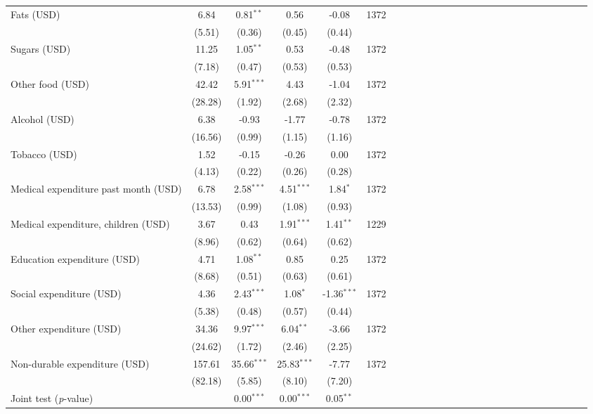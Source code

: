 {\begin{tabular}{l*{5}{SSSSc}}
\hspace{0.2cm}Fats (USD)&     6.84&0.81$^{**}$&     0.56&    -0.08&     1372\\
          &   (5.51)&   (0.36)&   (0.45)&   (0.44)&         \\
\hspace{0.2cm}Sugars (USD)&    11.25&1.05$^{**}$&     0.53&    -0.48&     1372\\
          &   (7.18)&   (0.47)&   (0.53)&   (0.53)&         \\
\hspace{0.2cm}Other food (USD)&    42.42&5.91$^{***}$&     4.43&    -1.04&     1372\\
          &  (28.28)&   (1.92)&   (2.68)&   (2.32)&         \\
Alcohol (USD)&     6.38&    -0.93&    -1.77&    -0.78&     1372\\
          &  (16.56)&   (0.99)&   (1.15)&   (1.16)&         \\
Tobacco (USD)&     1.52&    -0.15&    -0.26&     0.00&     1372\\
          &   (4.13)&   (0.22)&   (0.26)&   (0.28)&         \\
Medical expenditure past month (USD)&     6.78&2.58$^{***}$&4.51$^{***}$&1.84$^{*}$&     1372\\
          &  (13.53)&   (0.99)&   (1.08)&   (0.93)&         \\
\hspace{0.2cm}Medical expenditure, children (USD)&     3.67&     0.43&1.91$^{***}$&1.41$^{**}$&     1229\\
          &   (8.96)&   (0.62)&   (0.64)&   (0.62)&         \\
Education expenditure (USD)&     4.71&1.08$^{**}$&     0.85&     0.25&     1372\\
          &   (8.68)&   (0.51)&   (0.63)&   (0.61)&         \\
Social expenditure (USD)&     4.36&2.43$^{***}$&1.08$^{*}$&-1.36$^{***}$&     1372\\
          &   (5.38)&   (0.48)&   (0.57)&   (0.44)&         \\
Other expenditure (USD)&    34.36&9.97$^{***}$&6.04$^{**}$&    -3.66&     1372\\
          &  (24.62)&   (1.72)&   (2.46)&   (2.25)&         \\
Non-durable expenditure (USD)&   157.61&35.66$^{***}$&25.83$^{***}$&    -7.77&     1372\\
          &  (82.18)&   (5.85)&   (8.10)&   (7.20)&         \\
\midrule Joint test (\emph{p}-value)&         &{0.00$^{***}$}&{0.00$^{***}$}&{0.05$^{**}$}&         \\
\bottomrule
\end{tabular}
}
